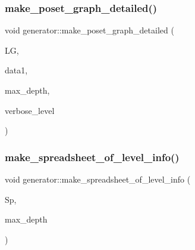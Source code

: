 \mbox{\label{classgenerator_a4f8b07122d32e3db0788f5a385bb1615}} 
\subsubsection{\texorpdfstring{make\+\_\+poset\+\_\+graph\+\_\+detailed()}{make\_poset\_graph\_detailed()}}
{\footnotesize\ttfamily void generator\+::make\+\_\+poset\+\_\+graph\+\_\+detailed (\begin{DoxyParamCaption}\item[{\mbox{\hyperlink{classlayered__graph}{layered\+\_\+graph}} $\ast$\&}]{LG,  }\item[{\mbox{\hyperlink{galois_8h_a09fddde158a3a20bd2dcadb609de11dc}{I\+NT}}}]{data1,  }\item[{\mbox{\hyperlink{galois_8h_a09fddde158a3a20bd2dcadb609de11dc}{I\+NT}}}]{max\+\_\+depth,  }\item[{\mbox{\hyperlink{galois_8h_a09fddde158a3a20bd2dcadb609de11dc}{I\+NT}}}]{verbose\+\_\+level }\end{DoxyParamCaption})}

\mbox{\label{classgenerator_af24c5959de39cf89f983a29b8f6de902}} 
\subsubsection{\texorpdfstring{make\+\_\+spreadsheet\+\_\+of\+\_\+level\+\_\+info()}{make\_spreadsheet\_of\_level\_info()}}
{\footnotesize\ttfamily void generator\+::make\+\_\+spreadsheet\+\_\+of\+\_\+level\+\_\+info (\begin{DoxyParamCaption}\item[{\mbox{\hyperlink{classspreadsheet}{spreadsheet}} $\ast$\&}]{Sp,  }\item[{\mbox{\hyperlink{galois_8h_a09fddde158a3a20bd2dcadb609de11dc}{I\+NT}}}]{max\+\_\+depth }\end{DoxyParamCaption})}

\mbox{\label{classgenerator_a2fb3f7b149d0207cf859b33529282e22}} 
